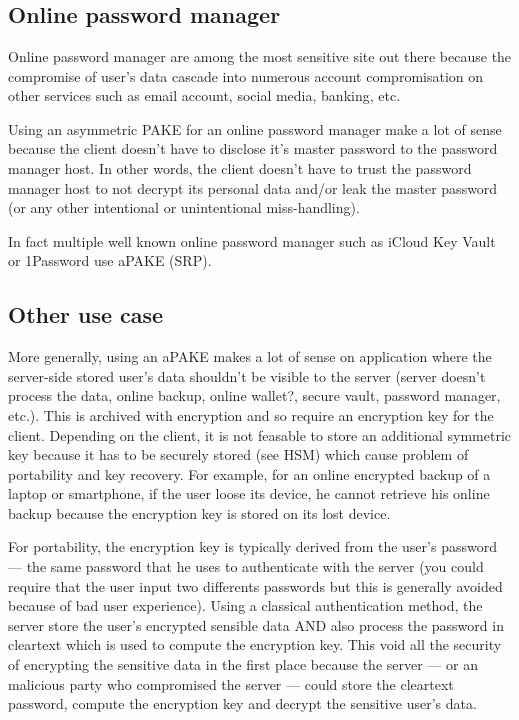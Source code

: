 \documentclass[../report.tex]{subfiles}
\begin{document}
\chapter{}
\section{Online password manager}
Online password manager are among the most sensitive site out there because the compromise of user's data cascade into numerous account compromisation on other services such as email account, social media, banking, etc.

Using an asymmetric PAKE for an online password manager make a lot of sense because the client doesn't have to disclose it's master password to the password manager host. In other words, the client doesn't have to trust the password manager host to not decrypt its personal data and/or leak the master password (or any other intentional or unintentional miss-handling).

In fact multiple well known online password manager such as iCloud Key Vault or 1Password use aPAKE (SRP).

\section{Other use case}

More generally, using an aPAKE makes a lot of sense on application where the server-side stored user's data shouldn't be visible to the server (server doesn't process the data, online backup, online wallet?, secure vault, password manager, etc.). This is archived with encryption and so require an encryption key for the client.
Depending on the client, it is not feasable to store an additional symmetric key because it has to be securely stored (see HSM) which cause problem of portability and key recovery. For example, for an online encrypted backup of a laptop or smartphone, if the user loose its device, he cannot retrieve his online backup because the encryption key is stored on its lost device.

For portability, the encryption key is typically derived from the user's password --- the same password that he uses to authenticate with the server (you could require that the user input two differents passwords but this is generally avoided because of bad user experience). Using a classical authentication method, the server store the user's encrypted sensible data AND also process the password in cleartext which is used to compute the encryption key. This void all the security of encrypting the sensitive data in the first place because the server --- or an malicious party who compromised the server --- could store the cleartext password, compute the encryption key and decrypt the sensitive user's data.
\end{document}
